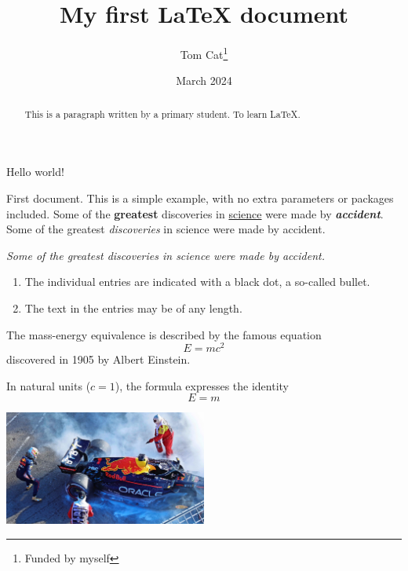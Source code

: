 \documentclass[12pt, letterpaper]{article}
\title{My first LaTeX document}
\author{Tom Cat\thanks{Funded by myself}}
\date{March 2024}
\begin{document}
\maketitle
Hello world!
\begin{abstract}
    This is a paragraph written by a primary student.
    To learn LaTeX.
\end{abstract}


First document. This is a simple example, with no
extra parameters or packages included.
Some of the \textbf{greatest}
discoveries in \underline{science}
were made by \textbf{\textit{accident}}.
Some of the greatest \emph{discoveries} in science 
were made by accident.

\textit{Some of the greatest \emph{discoveries} 
in science were made by accident.}


\begin{enumerate}
    \item The individual entries are indicated with a black dot, a so-called bullet.
    \item The text in the entries may be of any length.
\end{enumerate}

The mass-energy equivalence is described by the famous equation
\[ E=mc^2 \] discovered in 1905 by Albert Einstein. 

In natural units ($c = 1$), the formula expresses the identity
\begin{equation}
E=m
\end{equation}

\includegraphics[width=0.5\textwidth]{GEEJj_kXYAImdwn}
\end{document}
